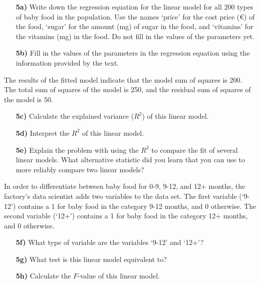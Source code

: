 \begin{itemize}

    \item[\textbf{5a)}] Write down the regression equation for the linear model for all 200 types of baby food in the population. Use the names ‘price’ for the cost price (\euro) of the food, ‘sugar’ for the amount (mg) of sugar in the food, and ‘vitamins’ for the vitamins (mg) in the food. Do not fill in the values of the parameters yet. 
    
    \item[\textbf{5b)}] Fill in the values of the parameters in the regression equation using the information provided by the text.

\end{itemize}

The results of the fitted model indicate that the model sum of squares is 200. The total sum of squares of the model is 250, and the residual sum of squares of the model is 50.

\begin{itemize}

    \item[\textbf{5c)}] Calculate the explained variance ($R^2$) of this linear model.
    
    \item[\textbf{5d)}] Interpret the $R^2$ of this linear model.
    
    \item[\textbf{5e)}] Explain the problem with using the $R^2$ to compare the fit of several linear models. What alternative statistic did you learn that you can use to more reliably compare two linear models? 
    
\end{itemize}

\clearpage %

In order to differentiate between baby food for 0-9, 9-12, and 12+ months, the factory’s data scientist adds two variables to the data set. The first variable (‘9-12’) contains a 1 for baby food in the category 9-12 months, and 0 otherwise. The second variable (‘12+’) contains a 1 for baby food in the category 12+ months, and 0 otherwise.

\begin{itemize}
    
    \item[\textbf{5f)}] What type of variable are the variables ‘9-12’ and ‘12+’? 
    
    \item[\textbf{5g)}] What test is this linear model equivalent to?
    
    \item[\textbf{5h)}] Calculate the $F$-value of this linear model.
    
\end{itemize}


